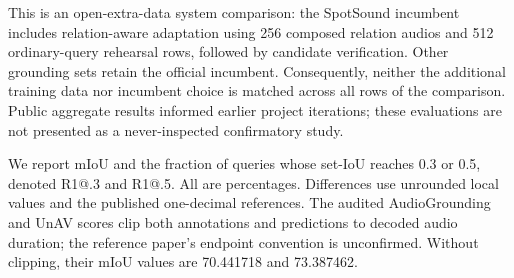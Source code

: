 This is an open-extra-data system comparison: the SpotSound incumbent includes relation-aware adaptation using 256 composed relation audios and 512 ordinary-query rehearsal rows, followed by candidate verification. Other grounding sets retain the official incumbent. Consequently, neither the additional training data nor incumbent choice is matched across all rows of the comparison. Public aggregate results informed earlier project iterations; these evaluations are not presented as a never-inspected confirmatory study.

We report mIoU and the fraction of queries whose set-IoU reaches 0.3 or 0.5, denoted R1@.3 and R1@.5. All are percentages. Differences use unrounded local values and the published one-decimal references. The audited AudioGrounding and UnAV scores clip both annotations and predictions to decoded audio duration; the reference paper's endpoint convention is unconfirmed. Without clipping, their mIoU values are 70.441718 and 73.387462.
